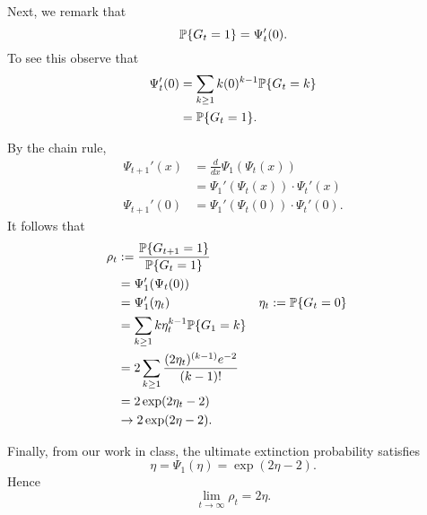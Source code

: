 \documentclass[10pt]{article}
\DeclarePairedDelimiter{\set}{\lbrace}{\rbrace}
\renewcommand{\P}{\mathbb{P}}
\begin{document}
Next,
we remark that
\[
  \P\set{G_t=1} = \Psi_t'(0).
\]
To see this observe that
\begin{align*}
  \Psi_t'(0)
  &= \sum_{k\geq 1} k(0)^{k-1} \P\set{G_t=k} \\
  &= \P\set{G_t=1}.
\end{align*}

By the chain rule,
\begin{align*}
  \Psi_{t+1}'(x)
  &= \frac{d}{dx} \Psi_1(\Psi_t(x)) \\
  &= \Psi_1'(\Psi_t(x))\cdot \Psi_t'(x) \\
  \Psi_{t+1}'(0)
  &= \Psi_1'(\Psi_t(0))\cdot \Psi_t'(0).
\end{align*}
It follows that
\begin{align*}
  \rho_t
  &:= \frac{\P\set{G_{t+1} = 1}}{\P\set{G_t=1}} \\
  &= \Psi_1'(\Psi_t(0)) \\
  &= \Psi_1'(\eta_t) &&\eta_t := \P\set{G_t = 0} \\
  &= \sum_{k\geq 1} k\eta_t^{k-1} \P\set{G_1 = k} \\
  &= 2 \sum_{k\geq 1} \frac{(2\eta_t)^{(k-1)} e^{-2}}{(k-1)!} \\
  &= 2 \exp(2\eta_t-2) \\
  &\to 2\exp(2\eta - 2).
\end{align*}

Finally,
from our work in class,
the ultimate extinction probability satisfies
\[
  \eta = \Psi_1(\eta) = \exp(2\eta-2).
\]
Hence
\[
  \boxed{\lim_{t\to \infty} \rho_t = 2\eta}.
\]
\end{document}
